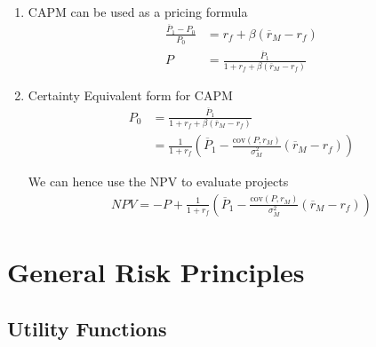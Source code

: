 \documentclass[12pt,twoside]{article}
\begin{document}
\begin{enumerate}
		\item CAPM can be used as a pricing formula
			\begin{align*}
				\frac{\overline{P}_1 - P_0}{P_0} &=  r_f + \beta (\overline{r}_M - r_f)\\
				P & = \frac{\overline{P}_1}{1+ r_f + \beta (\overline{r}_M - r_f)}
			\end{align*}
		
		\item Certainty Equivalent form for CAPM
		\begin{align*}
			P_0 	&= \frac{\overline{P}_1 }{1+r_f + \beta (\overline{r}_M - r_f)}\\
					& = \frac{1}{1+r_f}\left(\overline{P}_1 - \frac{\text{cov}(P, r_M)}{\sigma^2_M}(\overline{r}_M - r_f) \right)
		\end{align*}
		
		We can hence use the NPV to evaluate projects
		\begin{align*}
			NPV = -P + \frac{1}{1+r_f}\left(\overline{P}_1 - \frac{\text{cov}(P, r_M)}{\sigma^2_M}(\overline{r}_M - r_f) \right)
		\end{align*}				
		
		
\end{enumerate}

\newpage 

\section{General Risk Principles}
\subsection{Utility Functions}
\end{document}
